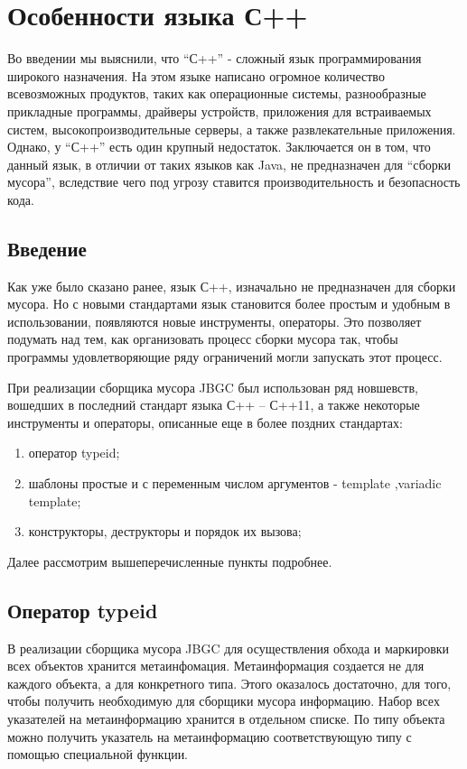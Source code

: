 \section{Особенности языка С++}

 
Во введении мы выяснили, что “С++” - сложный язык программирования широкого назначения. На этом языке написано огромное количество всевозможных продуктов, таких как операционные системы, разнообразные прикладные программы, драйверы устройств, приложения для встраиваемых систем, высокопроизводительные серверы, а также развлекательные приложения.
Однако, у “С++” есть один крупный недостаток. Заключается он в том, что данный язык, в отличии от таких языков как Java, не предназначен для “сборки мусора”, вследствие чего под угрозу ставится производительность и безопасность кода.

\subsection{Введение} 

Как уже было сказано ранее, язык С++, изначально не предназначен для сборки мусора. Но с новыми стандартами язык становится более простым и удобным в использовании, появляются новые инструменты, операторы. Это позволяет подумать над тем, как организовать процесс сборки мусора так, чтобы программы удовлетворяющие ряду ограничений могли запускать этот процесс.

При реализации сборщика мусора JBGC был использован ряд новшевств, вошедших в последний стандарт языка С++ -- С++11\cite{standart}, а также некоторые инструменты и операторы, описанные еще в более поздних стандартах: 
\begin{enumerate}
\item оператор typeid;
\item шаблоны простые и с переменным числом аргументов -  template ,variadic template;
\item  конструкторы, деструкторы и порядок их вызова;
\end{enumerate}
Далее рассмотрим вышеперечисленные пункты подробнее.
\subsection{Оператор typeid} 

В реализации сборщика мусора JBGC для осуществления обхода и маркировки всех объектов хранится метаинфомация.  Метаинформация создается не для каждого объекта, а для конкретного типа. Этого оказалось достаточно, для того, чтобы получить необходимую для сборщики мусора информацию. Набор всех указателей на метаинформацию хранится в отдельном списке. По типу объекта можно получить указатель на метаинформацию соответствующую типу с помощью специальной функции.

